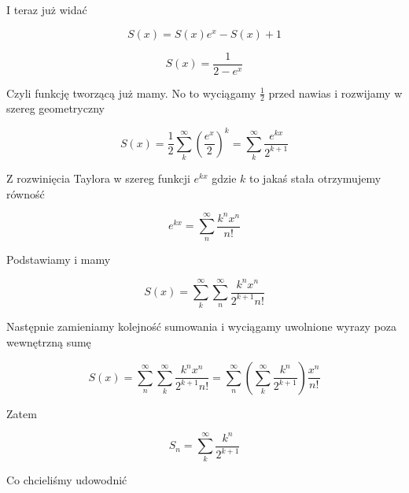 \documentclass[a4paper,11pt]{article}
\begin{document}
I teraz już widać

\[
  S(x) = S(x)e^{x} - S(x) + 1
\]

\[
  S(x) = \frac{1}{2 - e^x}
\]

Czyli funkcję tworzącą już mamy. No to wyciągamy $\frac{1}{2}$ przed nawias i rozwijamy w szereg geometryczny

\[
  S(x) = \frac{1}{2} \sum_{k}^{\infty} (\frac{e^{x}}{2})^k = \sum_{k}^{\infty} \frac{e^{kx}}{2^{k+1}} 
\]

Z rozwinięcia Taylora w szereg funkcji $e^{kx}$ gdzie $k$ to jakaś stała otrzymujemy równość

\[
  e^{kx} = \sum_{n}^{\infty} \frac{k^n x^n}{n!}
\]

Podstawiamy i mamy

\[
  S(x) = \sum_{k}^{\infty} \sum_{n}^{\infty} \frac{k^n x^n}{2^{k+1} n!}
\]

Następnie zamieniamy kolejność sumowania i wyciągamy uwolnione wyrazy poza wewnętrzną sumę

\[
  S(x) = \sum_{n}^{\infty} \sum_{k}^{\infty} \frac{k^n x^n}{2^{k+1} n!} = \sum_{n}^{\infty} \left( \sum_{k}^{\infty} \frac{k^n}{2^{k+1}} \right) \frac{x^n}{n!}
\]

Zatem

\[
  S_n = \sum_{k}^{\infty} \frac{k^n}{2^{k+1}} 
\]

Co chcieliśmy udowodnić
\end{document}
